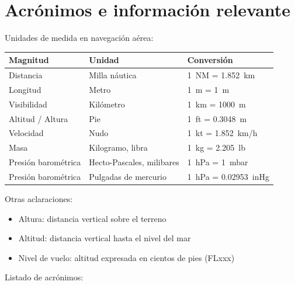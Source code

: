 \chapter*{Acrónimos e información relevante}

Unidades de medida en navegación aérea:

\begin{table}[!hbtp]
	\begin{center}
		\begin{tabular}{l l l}
		Magnitud 			& Unidad 					& Conversión \\			
		\hline
		Distancia 			& Milla náutica 			& \SI{1}{NM} = \SI{1.852}{km} \\			
		Longitud 			& Metro 					& \SI{1}{m} = \SI{1}{m} \\			
		Visibilidad 		& Kilómetro 				& \SI{1}{km} = \SI{1000}{m} \\			
		Altitud / Altura 	& Pie 						& \SI{1}{ft} = \SI{0.3048}{m} \\			
		Velocidad 			& Nudo 						& \SI{1}{kt} = \SI{1.852}{km/h} \\
		Masa 				& Kilogramo, libra 			& \SI{1}{kg} = \SI{2.205}{lb} \\			
		Presión barométrica & Hecto-Pascales, milibares & \SI{1}{hPa} = \SI{1}{mbar} \\		
		Presión barométrica	& Pulgadas de mercurio 		& \SI{1}{hPa} = \SI{0.02953}{inHg} \\ 		 
		\end{tabular}
	\end{center}
\end{table}


Otras aclaraciones:

\begin{itemize}
	\item Altura: distancia vertical sobre el terreno
	\item Altitud: distancia vertical hasta el nivel del mar
	\item Nivel de vuelo: altitud expresada en cientos de pies (FLxxx)
\end{itemize}






\clearpage


Listado de acrónimos:

